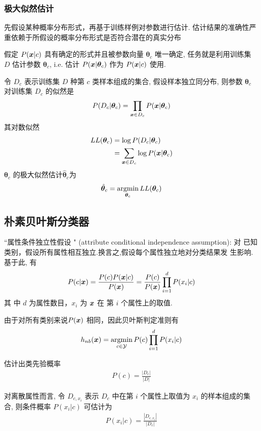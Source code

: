 \subsubsection{极大似然估计}
先假设某种概率分布形式，再基于训练样例对参数进行估计. 估计结果的准确性严重依赖于所假设的概率分布形式是否符合潜在的真实分布

假定 $P(\bm{x}|c)$ 具有确定的形式并且被参数向量 $\bm{\theta}_c$ 唯一确定, 任务就是利用训练集 $D$ 估计参数 $\bm{\theta}_c$, i.e. 估计 $P(\bm{x}|\bm{\theta}_c)$ 作为 $P(\bm{x}|c)$ 使用. 

令 $D_c$ 表示训练集 $D$ 种第 $c$ 类样本组成的集合, 假设样本独立同分布, 则参数 $\bm{\theta}_c$ 对训练集 $D_c$ 的似然是
\begin{align*}
    P(D_c| \bm{\theta}_c)=\prod_{\bm{x}\in D_c}P(\bm{x}|\bm{\theta}_c)
\end{align*}
其对数似然
\begin{align*}
    LL(\bm{\theta}_c)&=\log P(D_c|\bm{\theta}_c)\\
    &=\sum_{\bm{x}\in D_c}\log P(\bm{x}|\bm{\theta}_c)
\end{align*}
$\bm{\theta}_c$ 的极大似然估计$\hat{\bm{\theta}}_c$为
\begin{align*}
    \hat{\bm{\theta}}_c=\operatorname*{argmin}_{\bm{\theta}_c}LL(\bm{\theta}_c)
\end{align*}


\subsection{朴素贝叶斯分类器}
“属性条件独立性假设 " (attribute conditional independence assumption): 对
已知类别，假设所有属性相互独立.换言之,假设每个属性独立地对分类结果发
生影响. 基于此, 有
\begin{align*}
    P(c|\bm{x})=\frac{P(c)P(\bm{x}|c)}{P(\bm{x})}=\frac{P(c)}{P(\bm{x})}\prod_{i=1}^dP(x_i|c)
\end{align*}
其 中 $d$ 为属性数目，$x_i$ 为 $\bm{x}$ 在 第 $i$ 个属性上的取值.

由于对所有类别来说$P (\bm{x} )$ 相同，因此贝叶斯判定准则有
\begin{align*}
    h_{nb}(\bm{x})=\operatorname*{argmin}_{c\in\mathcal{Y}}P(c)\prod_{i=1}^d P(x_i|c)
\end{align*}

估计出类先验概率
\begin{align*}
    P(c)=\frac{|D_c|}{|D|}
\end{align*}

对离散属性而言, 令 $D_{c, x_i}$ 表示 $D_c$ 中在第 $i$ 个属性上取值为 $x_i$ 的样本组成的集合, 则条件概率 $P(x_i|c)$ 可估计为
\begin{align*}
    P(x_i|c)=\frac{|D_{c,x_i}|}{|D_c|}
\end{align*}


